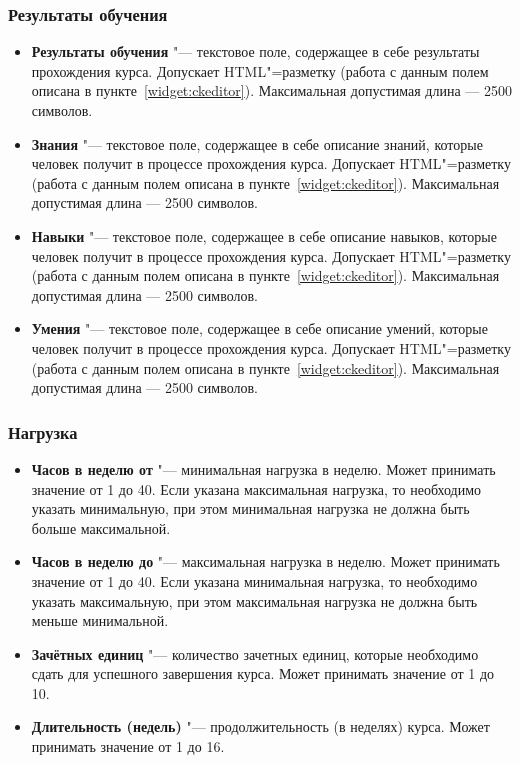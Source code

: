 \subsubsection{Результаты обучения}
	\begin{itemize}
		\item \textbf{Результаты обучения} "--- текстовое поле, содержащее в себе результаты прохождения курса. Допускает HTML"=разметку (работа с данным полем описана в пункте~\ref{widget:ckeditor}).
		Максимальная допустимая длина --- 2500 символов.
		\item \textbf{Знания} "--- текстовое поле, содержащее в себе описание знаний, которые человек получит в процессе прохождения курса. Допускает HTML"=разметку (работа с данным полем описана в пункте~\ref{widget:ckeditor}).
		Максимальная допустимая длина --- 2500 символов.
		\item \textbf{Навыки} "--- текстовое поле, содержащее в себе описание навыков, которые человек получит в процессе прохождения курса. Допускает HTML"=разметку (работа с данным полем описана в пункте~\ref{widget:ckeditor}).
		Максимальная допустимая длина --- 2500 символов.
		\item \textbf{Умения} "--- текстовое поле, содержащее в себе описание умений, которые человек получит в процессе прохождения курса. Допускает HTML"=разметку (работа с данным полем описана в пункте~\ref{widget:ckeditor}).
		Максимальная допустимая длина --- 2500 символов.
	\end{itemize}
\subsubsection{Нагрузка}
	\begin{itemize}
		\item \textbf{Часов в неделю от} "--- минимальная нагрузка в неделю. Может принимать значение от 1 до 40. Если указана максимальная нагрузка, то необходимо указать минимальную, при этом минимальная нагрузка не должна быть больше максимальной.
		\item \textbf{Часов в неделю до} "--- максимальная нагрузка в неделю. Может принимать значение от 1 до 40. Если указана минимальная нагрузка, то необходимо указать максимальную, при этом максимальная нагрузка не должна быть меньше минимальной.
		\item \textbf{Зачётных единиц} "--- количество зачетных единиц, которые необходимо сдать для успешного завершения курса. Может принимать значение от 1 до 10.
		\item \textbf{Длительность (недель)} "--- продолжительность (в неделях) курса. Может принимать значение от 1 до 16.
	\end{itemize}
